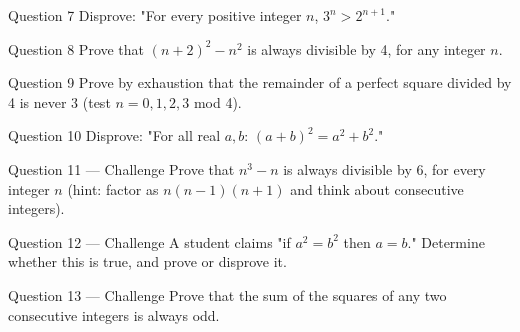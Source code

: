 \documentclass[11pt]{article}
\begin{document}
\begin{qbox}{Question 7}
Disprove: "For every positive integer $n$, $3^n>2^{n+1}$."\workspace{2.4cm}
\end{qbox}

\begin{qbox}{Question 8}
Prove that $(n+2)^2-n^2$ is always divisible by 4, for any integer $n$.\workspace{2.4cm}
\end{qbox}

\begin{qbox}{Question 9}
Prove by exhaustion that the remainder of a perfect square divided by 4 is never 3 (test $n=0,1,2,3$ mod 4).\workspace{2.4cm}
\end{qbox}

\begin{qbox}{Question 10}
Disprove: "For all real $a,b$: $(a+b)^2=a^2+b^2$."\workspace{2.4cm}
\end{qbox}

\begin{qbox}{Question 11 --- Challenge}
Prove that $n^3-n$ is always divisible by 6, for every integer $n$ (hint: factor as $n(n-1)(n+1)$ and think about consecutive integers).\workspace{3.6cm}
\end{qbox}

\begin{qbox}{Question 12 --- Challenge}
A student claims "if $a^2=b^2$ then $a=b$." Determine whether this is true, and prove or disprove it.\workspace{3.2cm}
\end{qbox}

\begin{qbox}{Question 13 --- Challenge}
Prove that the sum of the squares of any two consecutive integers is always odd.\workspace{3.2cm}
\end{qbox}

\clearpage
{}
\end{document}
